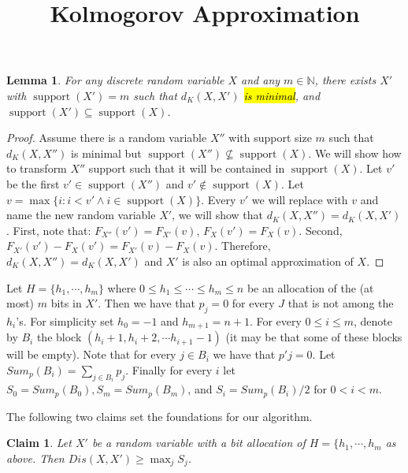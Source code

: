 \documentclass{article}
\title{Kolmogorov Approximation}
\newtheorem{lemma}{Lemma}
\newtheorem{claim}{Claim}
\DeclareMathOperator{\support}{support}
\begin{document}

\maketitle



\begin{lemma}
For any discrete random variable $X$ and any $m \in \mathbb{N}$, there exists $X'$ with  $\support(X')=m$ such that $d_K(X,X')$ \hl{is minimal}, and $\support(X')\subseteq\support(X)$.
\end{lemma}

\begin{proof}
Assume there is a random variable $X''$ with support size $m$ such that $d_K(X,X'')$ is minimal but $\support(X'')\nsubseteq\support(X)$.
We will show how to transform $X''$ support such that it will be contained in $\support(X)$. Let $v'$ be the first $v'\in\support(X'')$ and $v' \not\in\support(X)$. Let $v=\max\{i: i<v' \wedge i\in\support(X)\}$. Every $v'$ we will replace with $v$ and name the new random variable $X'$, we will show that $d_K(X,X'') = d_K(X,X')$. First, note that:
$F_{X''}(v')=F_{X'}(v)$, $F_{X}(v')=F_{X}(v)$.
Second,  $F_{X'}(v')-F_{X}(v') = F_{X'}(v)-F_{X}(v)$. Therefore, $d_K(X,X'') = d_K(X,X')$ and $X'$ is also an optimal approximation of $X$.

\end{proof}

Let $H=\{h_1,\cdots,h_m\}$ where $0\leq h_1\leq \cdots \leq h_m \leq n$ be an allocation of the (at most) $m$ bits in $X'$. Then we have that  $p_j=0$ for every $J$ that is not among the $h_i$'s. For simplicity set $h_0=-1$ and $h_{m+1}=n+1$. For every $0\leq i\leq m$, denote by $B_i$ the block $(h_i+1,h_i+2,\cdots h_{i+1}-1)$ (it may be that some of these blocks will be empty). Note that for every $j\in B_i$ we have that $p'j=0$. Let $Sum_p(B_i)=\sum_{j\in B_i}p_j$. Finally for every $i$ let $S_0=Sum_p(B_0), S_m = Sum_p(B_m)$, and $S_i=Sum_p(B_i)/2$ for $0<i<m$.

The following two claims set the foundations for our algorithm.

\begin{claim}\label{clm:geq}
	Let $X'$ be a random variable with a bit allocation of $H=\{h_1,\cdots,h_m$ as above. Then $Dis(X,X')\geq \max_j S_j$. 
\end{claim}
\end{document}
